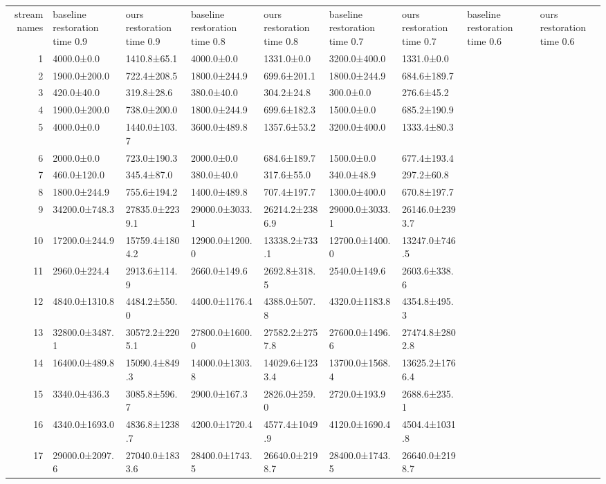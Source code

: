 \begin{tabular}{|r|l|l|l|l|l|l|l|l|}
  \hline
  stream names & baseline restoration time 0.9 & ours restoration time 0.9 & baseline restoration time 0.8 & ours restoration time 0.8 & baseline restoration time 0.7 & ours restoration time 0.7 & baseline restoration time 0.6 & ours restoration time 0.6 \\ 
  1 & 4000.0±0.0 & 1410.8±65.1 & 4000.0±0.0 & 1331.0±0.0 & 3200.0±400.0 & 1331.0±0.0 \\ 
  2 & 1900.0±200.0 & 722.4±208.5 & 1800.0±244.9 & 699.6±201.1 & 1800.0±244.9 & 684.6±189.7 \\ 
  3 & 420.0±40.0 & 319.8±28.6 & 380.0±40.0 & 304.2±24.8 & 300.0±0.0 & 276.6±45.2 \\ 
  4 & 1900.0±200.0 & 738.0±200.0 & 1800.0±244.9 & 699.6±182.3 & 1500.0±0.0 & 685.2±190.9 \\ 
  5 & 4000.0±0.0 & 1440.0±103.7 & 3600.0±489.8 & 1357.6±53.2 & 3200.0±400.0 & 1333.4±80.3 \\ 
  6 & 2000.0±0.0 & 723.0±190.3 & 2000.0±0.0 & 684.6±189.7 & 1500.0±0.0 & 677.4±193.4 \\ 
  7 & 460.0±120.0 & 345.4±87.0 & 380.0±40.0 & 317.6±55.0 & 340.0±48.9 & 297.2±60.8 \\ 
  8 & 1800.0±244.9 & 755.6±194.2 & 1400.0±489.8 & 707.4±197.7 & 1300.0±400.0 & 670.8±197.7 \\ 
  9 & 34200.0±748.3 & 27835.0±2239.1 & 29000.0±3033.1 & 26214.2±2386.9 & 29000.0±3033.1 & 26146.0±2393.7 \\ 
  10 & 17200.0±244.9 & 15759.4±1804.2 & 12900.0±1200.0 & 13338.2±733.1 & 12700.0±1400.0 & 13247.0±746.5 \\ 
  11 & 2960.0±224.4 & 2913.6±114.9 & 2660.0±149.6 & 2692.8±318.5 & 2540.0±149.6 & 2603.6±338.6 \\ 
  12 & 4840.0±1310.8 & 4484.2±550.0 & 4400.0±1176.4 & 4388.0±507.8 & 4320.0±1183.8 & 4354.8±495.3 \\ 
  13 & 32800.0±3487.1 & 30572.2±2205.1 & 27800.0±1600.0 & 27582.2±2757.8 & 27600.0±1496.6 & 27474.8±2802.8 \\ 
  14 & 16400.0±489.8 & 15090.4±849.3 & 14000.0±1303.8 & 14029.6±1233.4 & 13700.0±1568.4 & 13625.2±1766.4 \\ 
  15 & 3340.0±436.3 & 3085.8±596.7 & 2900.0±167.3 & 2826.0±259.0 & 2720.0±193.9 & 2688.6±235.1 \\ 
  16 & 4340.0±1693.0 & 4836.8±1238.7 & 4200.0±1720.4 & 4577.4±1049.9 & 4120.0±1690.4 & 4504.4±1031.8 \\ 
  17 & 29000.0±2097.6 & 27040.0±1833.6 & 28400.0±1743.5 & 26640.0±2198.7 & 28400.0±1743.5 & 26640.0±2198.7 \\ 

\end{tabular}

